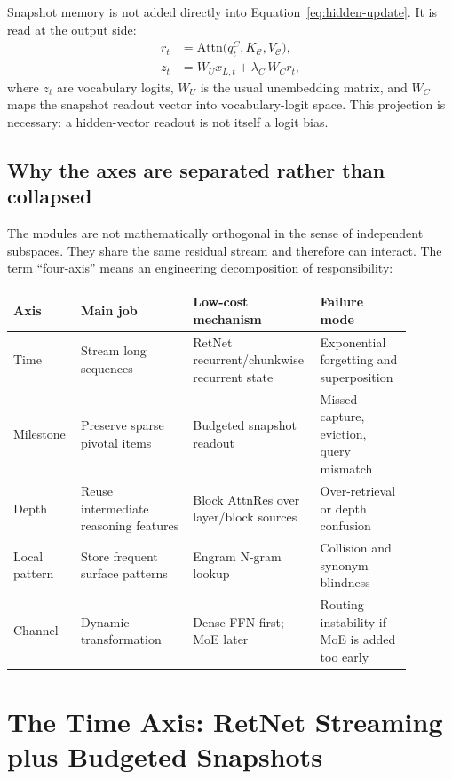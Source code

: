 \documentclass[11pt]{article}
\newcommand{\Cache}{\mathcal{C}}
\begin{document}
Snapshot memory is not added directly into Equation~\eqref{eq:hidden-update}. It is read at the output side:
\begin{align}
\label{eq:snapshot-read}
r_t &= \mathrm{Attn}\big(q_t^C, K_{\Cache}, V_{\Cache}\big),\\
z_t &= W_U x_{L,t} + \lambda_{C}\, W_C r_t,
\label{eq:logit-read}
\end{align}
where $z_t$ are vocabulary logits, $W_U$ is the usual unembedding matrix, and $W_C$ maps the snapshot readout vector into vocabulary-logit space. This projection is necessary: a hidden-vector readout is not itself a logit bias.

\subsection{Why the axes are separated rather than collapsed}

The modules are not mathematically orthogonal in the sense of independent subspaces. They share the same residual stream and therefore can interact. The term ``four-axis'' means an engineering decomposition of responsibility:
\begin{center}
\begin{tabular}{p{0.16\linewidth}p{0.27\linewidth}p{0.24\linewidth}p{0.22\linewidth}}
\toprule
Axis & Main job & Low-cost mechanism & Failure mode \\
\midrule
Time & Stream long sequences & RetNet recurrent/chunkwise recurrent state & Exponential forgetting and superposition \\
Milestone & Preserve sparse pivotal items & Budgeted snapshot readout & Missed capture, eviction, query mismatch \\
Depth & Reuse intermediate reasoning features & Block AttnRes over layer/block sources & Over-retrieval or depth confusion \\
Local pattern & Store frequent surface patterns & Engram N-gram lookup & Collision and synonym blindness \\
Channel & Dynamic transformation & Dense FFN first; MoE later & Routing instability if MoE is added too early \\
\bottomrule
\end{tabular}
\end{center}

\section{The Time Axis: RetNet Streaming plus Budgeted Snapshots}
\end{document}
